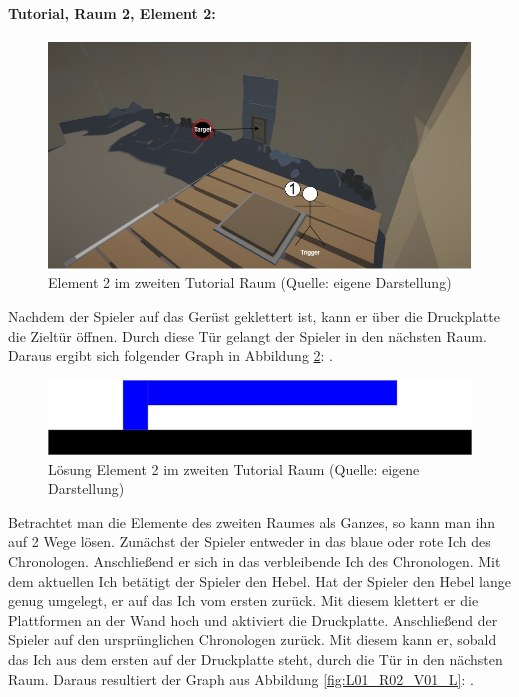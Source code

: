 \paragraph{Tutorial, Raum 2, Element 2:}

\begin{figure}[ht]
\centering
\includegraphics[width=0.8\linewidth]{content/pictures/Raetsel-L01_R02_R02.jpg}
\caption{Element 2 im zweiten Tutorial Raum (Quelle: eigene Darstellung)}
\label{fig:L01_R02_R02}
\end{figure}

Nachdem der Spieler auf das Gerüst geklettert ist, kann er über die Druckplatte die Zieltür öffnen. Durch diese Tür gelangt der Spieler in den nächsten Raum. Daraus ergibt sich folgender Graph in Abbildung \ref{fig:L01_R02_R02_L}: .

\begin{figure}[ht]
\centering
\includegraphics[width=0.8\linewidth]{content/pictures/Raetsel-L01_R02_R02_Loesung.jpg}
\caption{Lösung Element 2 im zweiten Tutorial Raum (Quelle: eigene Darstellung)}
\label{fig:L01_R02_R02_L}
\end{figure}

Betrachtet man die Elemente des zweiten Raumes als Ganzes, so kann man ihn auf 2 Wege lösen. Zunächst  der Spieler entweder in das blaue oder rote Ich des Chronologen. Anschließend  er sich in das verbleibende Ich des Chronologen. Mit dem aktuellen Ich betätigt der Spieler den Hebel. Hat der Spieler den Hebel lange genug umgelegt,  er auf das Ich vom ersten  zurück. Mit diesem klettert er die Plattformen an der Wand hoch und aktiviert die Druckplatte. Anschließend  der Spieler auf den ursprünglichen Chronologen zurück. Mit diesem kann er, sobald das Ich aus dem ersten  auf der Druckplatte steht, durch die Tür in den nächsten Raum. Daraus resultiert der Graph aus Abbildung \ref{fig:L01_R02_V01_L}: .

